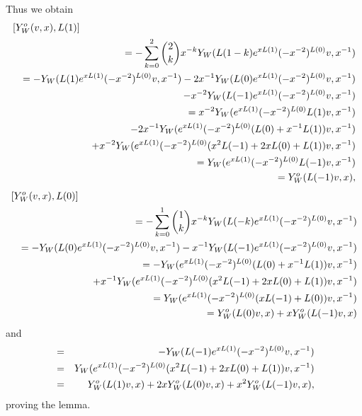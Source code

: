 \documentclass[12pt]{article}
\begin{document}
Thus we obtain
\begin{eqnarray*}
\lefteqn{[Y^o_W(v,x),L(1)]}\nn
&&=-\sum_{k=0}^{2}{2\choose k}x^{-k}Y_{W}(L(1-k)
e^{xL(1)}(-x^{-2})^{L(0)}v,x^{-1})\nn
&&=-Y_{W}(L(1)e^{xL(1)}(-x^{-2})^{L(0)}v,x^{-1})
-2x^{-1}Y_{W}(L(0)
e^{xL(1)}(-x^{-2})^{L(0)}v,x^{-1})\nn
&&\quad -x^{-2}Y_{W}(L(-1)
e^{xL(1)}(-x^{-2})^{L(0)}v,x^{-1})\nn
&&=x^{-2}Y_{W}(e^{xL(1)}(-x^{-2})^{L(0)}L(1)v,x^{-1})
\nn
&&\quad -2x^{-1}Y_{W}(
e^{xL(1)}(-x^{-2})^{L(0)}(L(0)+x^{-1}L(1))v,x^{-1})
\nn
&&\quad +x^{-2}Y_{W}(
e^{xL(1)}(-x^{-2})^{L(0)}(x^{2}L(-1)+2xL(0)+L(1))v,x^{-1})\nn
&&=Y_{W}(
e^{xL(1)}(-x^{-2})^{L(0)}L(-1)v,x^{-1})\nn
&&=Y_{W}^{o}(L(-1)v,x),
\end{eqnarray*}
\begin{eqnarray*}
\lefteqn{[Y^o_W(v,x),L(0)]}\nn
&&=-\sum_{k=0}^{1}{1\choose k}x^{-k}Y_{W}(L(-k)
e^{xL(1)}(-x^{-2})^{L(0)}v,x^{-1})\nn
&&=-Y_{W}(L(0)
e^{xL(1)}(-x^{-2})^{L(0)}v,x^{-1})
-x^{-1}Y_{W}(L(-1)
e^{xL(1)}(-x^{-2})^{L(0)}v,x^{-1})\nn
&&=-Y_{W}(e^{xL(1)}(-x^{-2})^{L(0)}(L(0)+x^{-1}L(1))v,x^{-1})\nn
&&\quad
+x^{-1}Y_{W}(
e^{xL(1)}(-x^{-2})^{L(0)}(x^{2}L(-1)+2xL(0)+L(1))v,x^{-1})\nn
&&=Y_{W}(
e^{xL(1)}(-x^{-2})^{L(0)}(xL(-1)+L(0))v,x^{-1})\nn
&&=Y_{W}^{o}(L(0)v,x)+xY_{W}^{o}(L(-1)v,x)
\end{eqnarray*}
and
\begin{eqnarray*}
[Y^o_W(v,x),L(-1)]&=&-Y_{W}(L(-1)
e^{xL(1)}(-x^{-2})^{L(0)}v,x^{-1})\nn
&=&Y_{W}(
e^{xL(1)}(-x^{-2})^{L(0)}(x^{2}L(-1)+2xL(0)+L(1))v,x^{-1})\nn
&=&Y_{W}^{o}(L(1)v,x)+2xY_{W}^{o}(L(0)v,x)+x^{2}Y_{W}^{o}(L(-1)v,x),
\end{eqnarray*}
proving the lemma.
\epfv
\end{document}
